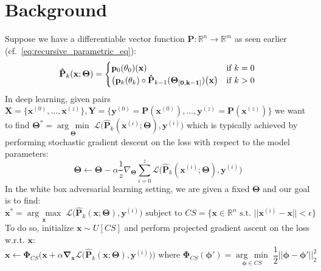 \documentclass[12pt,initial,twoside,maitrise]{dms}
\newcommand{\argmax}[1]{\underset{#1}{\operatorname{arg}\,\operatorname{max}}\;}
\newcommand{\argmin}[1]{\underset{#1}{\operatorname{arg}\,\operatorname{min}}\;}
\numberwithin{equation}{section}
\numberwithin{table}{chapter}
\numberwithin{figure}{chapter}
\begin{document}
\section{Background}
%
\noindent Suppose we have a differentiable vector function $\mathbf{P}: \mathbb{R}^n\rightarrow\mathbb{R}^m$ as seen earlier (cf.~\ref{eq:recursive_parametric_eq}):
%
\begin{equation}
    \mathbf{\hat P}_k(\mathbf{x}; \mathbf{\mathbf\Theta}) = \begin{cases} \mathbf{p}_0(\mathbf\theta_0)(\mathbf{x}) &\text{if } k=0\\ \big(\mathbf{p}_k(\mathbf\theta_k)\circ \mathbf{\hat P}_{k-1}(\mathbf{\Theta_{[0, k-1]}})\big(\mathbf{x}\big)&\text{if } k > 0 \end{cases} \\
\end{equation}
%
In deep learning, given pairs $\mathbf{X} = \{\mathbf{x}^{(0)}, \dots, \mathbf{x}^{(z)}\}, \mathbf{Y} = \{\mathbf{y}^{(0)} = \mathbf{P}(\mathbf{x}^{(0)}), \dots, \mathbf{y}^{(z)} = \mathbf{P}(\mathbf{x}^{(z)})\}$ we want to find $\mathbf{\Theta}^* = \argmin{\boldsymbol{\Theta}}\mathcal{L}\big(\mathbf{\hat P}_k(\mathbf{x}^{(i)}; \mathbf{\Theta}), \mathbf{y}^{(i)}\big)$ which is typically achieved by performing stochastic gradient descent on the loss with respect to the model parameters:
%
\begin{equation}
    \mathbf\Theta \leftarrow \mathbf\Theta - \alpha\frac{1}{z}\nabla_{\mathbf\Theta} \sum_{i=0}^z\mathcal{L}\big(\mathbf{\hat P}_k(\mathbf{x}^{(i)}; \mathbf{\Theta}), \mathbf{y}^{(i)}\big)
\end{equation}
%
In the white box adversarial learning setting, we are given a fixed $\mathbf \Theta$ and our goal is to find:
%
\begin{equation}
\mathbf{x}^* = \argmax{\mathbf{x}}\mathcal{L}\big(\mathbf{\hat P}_k(\mathbf{x}; \mathbf{\Theta}), \mathbf{y}^{(i)}\big) \text{ subject to } CS = \{\mathbf{x} \in \mathbb{R}^n \text{ s.t. } ||\mathbf{x}^{(i)} - \mathbf{x}|| < \epsilon\}
\end{equation}
%
 To do so, initialize $\mathbf{x} \sim U[CS]$ and perform projected gradient ascent on the loss w.r.t. $\mathbf x$:
%
\begin{equation}
    \mathbf x \leftarrow \mathbf{\Phi}_{CS}\Big(\mathbf x + \alpha\mathbf\nabla_{\mathbf x} \mathcal{L}\big(\mathbf{\hat P}_k(\mathbf{x}; \mathbf{\Theta}), \mathbf{y}^{(i)}\big)\Big) \text{ where }
	\mathbf{\Phi}_{CS}(\mathbf \phi') = \argmin{\mathbf \phi \in CS}\frac{1}{2}||\mathbf \phi - \mathbf \phi'||^2_2
\end{equation}
\end{document}
